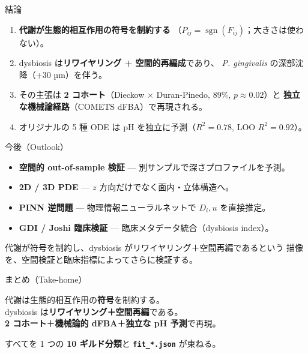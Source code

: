 \documentclass[
  ignorenonframetext,
  aspectratio=169,
]{beamer}
\providecommand{\tightlist}{%
  \setlength{\itemsep}{0pt}\setlength{\parskip}{0pt}}
\begin{document}
\begin{frame}{結論}
\protect\hypertarget{ux7d50ux8ad6}{}
\begin{enumerate}
\tightlist
\item
  \textbf{代謝が生態的相互作用の符号を制約する}
  （\(P_{ij}=\operatorname{sgn}(F_{ij})\)；大きさは使わない）。
\item
  dysbiosis は\textbf{リワイヤリング + 空間的再編成}であり、 \emph{P.
  gingivalis} の深部沈降（+30 µm）を伴う。
\item
  その主張は \textbf{2 コホート}（Dieckow \(\times\) Duran-Pinedo, 89\%,
  \(p\approx0.02\)）と \textbf{独立な機械論経路}（COMETS
  dFBA）で再現される。
\item
  オリジナルの 5 種 ODE は pH を独立に予測（\(R^2=0.78\), LOO
  \(R^2=0.92\)）。
\end{enumerate}
\end{frame}

\begin{frame}{今後（Outlook）}
\protect\hypertarget{ux4ecaux5f8coutlook}{}
\begin{itemize}
\tightlist
\item
  \textbf{空間的 out-of-sample 検証} ---
  別サンプルで深さプロファイルを予測。
\item
  \textbf{2D / 3D PDE} --- \(z\) 方向だけでなく面内・立体構造へ。
\item
  \textbf{PINN 逆問題} --- 物理情報ニューラルネットで \(D_i,u\)
  を直接推定。
\item
  \textbf{GDI / Joshi 臨床検証} --- 臨床メタデータ統合（dysbiosis
  index）。
\end{itemize}

\vspace{0.4em}

代謝が符号を制約し、dysbiosis がリワイヤリング＋空間再編であるという
描像を、空間検証と臨床指標によってさらに検証する。
\end{frame}

\begin{frame}[fragile]{まとめ（Take-home）}
\protect\hypertarget{ux307eux3068ux3081take-home}{}
\begin{center}
\large
代謝は生態的相互作用の\textbf{符号}を制約する。\\[0.3em]
dysbiosis は\textbf{リワイヤリング＋空間再編}である。\\[0.3em]
\textbf{2 コホート}＋\textbf{機械論的 dFBA}＋\textbf{独立な pH 予測}で再現。
\end{center}

\vspace{0.6em}

すべてを 1 つの \textbf{10 ギルド分類}と \textbf{\texttt{fit\_*.json}}
が束ねる。
\end{frame}
\end{document}
